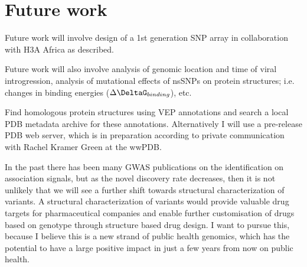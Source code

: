\chapter{Future work}
\label{chap:future}

Future work will involve design of a 1st generation SNP array in collaboration with H3A Africa as described.

Future work will also involve analysis of genomic location and time of viral introgression, analysis of mutational effects of nsSNPs on protein structures; i.e. changes in binding energies ($\Delta\DeltaG_{binding}$), etc.

Find homologous protein structures using \gls{VEP} annotations and search a local \gls{PDB} metadata archive for these annotations. Alternatively I will use a pre-release \gls{PDB} web server, which is in preparation according to private communication with Rachel Kramer Green at the \gls{wwPDB}.

In the past there has been many \gls{GWAS} publications on the identification on association signals, but as the novel discovery rate decreases, then it is not unlikely that we will see a further shift towards structural characterization of variants.\cite{Teng2009}\cite{Kucukkal201518} A structural characterization of variants would provide valuable drug targets for pharmaceutical companies and enable further customisation of drugs based on genotype through structure based drug design.\cite{Kuntz21081992} I want to pursue this, because I believe this is a new strand of public health genomics, which has the potential to have a large positive impact in just a few years from now on public health.